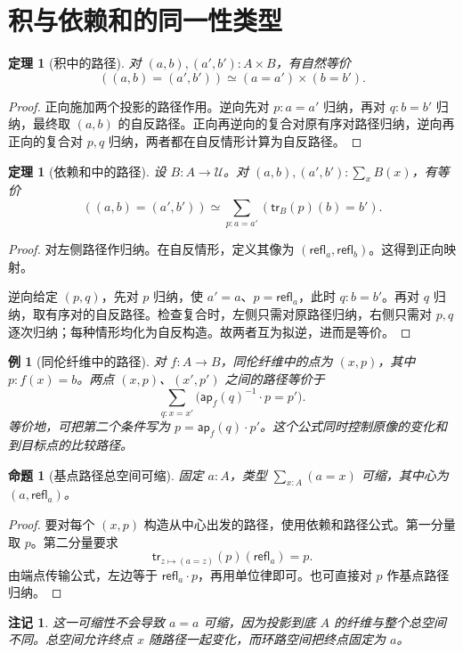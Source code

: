 \documentclass[12pt,oneside,openany,fontset=none]{ctexbook}
\theoremstyle{cn}
\newtheorem{example}[definition]{例}
\newtheorem{proposition}[definition]{命题}
\newtheorem{theorem}[definition]{定理}
\newtheorem{remark}[definition]{注记}
\numberwithin{equation}{chapter}
\newcommand{\U}{\mathcal U}
\newcommand{\refl}{\mathsf{refl}}
\newcommand{\ap}{\mathsf{ap}}
\newcommand{\tr}{\mathsf{tr}}
\begin{document}
\section{积与依赖和的同一性类型}
\begin{theorem}[积中的路径]
对 $(a,b),(a',b'):A\times B$，有自然等价
\[
((a,b)=(a',b'))\simeq(a=a')\times(b=b').
\]
\end{theorem}
\begin{proof}
正向施加两个投影的路径作用。逆向先对 $p:a=a'$ 归纳，再对 $q:b=b'$ 归纳，最终取 $(a,b)$ 的自反路径。正向再逆向的复合对原有序对路径归纳，逆向再正向的复合对 $p,q$ 归纳，两者都在自反情形计算为自反路径。
\end{proof}
\begin{theorem}[依赖和中的路径]\label{thm:sigma-path}
设 $B:A\to\U$。对 $(a,b),(a',b'):\sum_xB(x)$，有等价
\[
((a,b)=(a',b'))
\simeq\sum_{p:a=a'}(\tr_B(p)(b)=b').
\]
\end{theorem}
\begin{proof}
对左侧路径作归纳。在自反情形，定义其像为 $(\refl_a,\refl_b)$。这得到正向映射。

逆向给定 $(p,q)$，先对 $p$ 归纳，使 $a'=a$、$p=\refl_a$，此时 $q:b=b'$。再对 $q$ 归纳，取有序对的自反路径。检查复合时，左侧只需对原路径归纳，右侧只需对 $p,q$ 逐次归纳；每种情形均化为自反构造。故两者互为拟逆，进而是等价。
\end{proof}
\begin{example}[同伦纤维中的路径]
对 $f:A\to B$，同伦纤维中的点为 $(x,p)$，其中 $p:f(x)=b$。两点 $(x,p)$、$(x',p')$ 之间的路径等价于
\[
\sum_{q:x=x'}\bigl(\ap_f(q)^{-1}\cdot p=p'\bigr).
\]
等价地，可把第二个条件写为 $p=\ap_f(q)\cdot p'$。这个公式同时控制原像的变化和到目标点的比较路径。
\end{example}
\begin{proposition}[基点路径总空间可缩]\label{prop:based-contractible}
固定 $a:A$，类型 $\sum_{x:A}(a=x)$ 可缩，其中心为 $(a,\refl_a)$。
\end{proposition}
\begin{proof}
要对每个 $(x,p)$ 构造从中心出发的路径，使用依赖和路径公式。第一分量取 $p$。第二分量要求
\[
\tr_{z\mapsto(a=z)}(p)(\refl_a)=p.
\]
由端点传输公式，左边等于 $\refl_a\cdot p$，再用单位律即可。也可直接对 $p$ 作基点路径归纳。
\end{proof}
\begin{remark}
这一可缩性不会导致 $a=a$ 可缩，因为投影到底 $A$ 的纤维与整个总空间不同。总空间允许终点 $x$ 随路径一起变化，而环路空间把终点固定为 $a$。
\end{remark}
\end{document}
